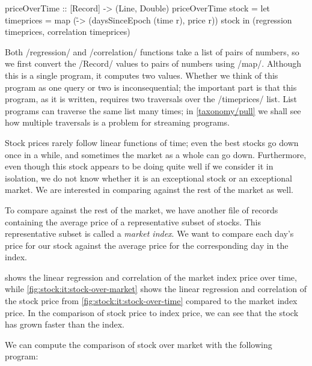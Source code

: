 \begin{haskell}
priceOverTime :: [Record] -> (Line, Double)
priceOverTime stock =
  let timeprices = map (\r -> (daysSinceEpoch (time r), price r)) stock
  in (regression timeprices, correlation timeprices)
\end{haskell}

Both \Hs/regression/ and \Hs/correlation/ functions take a list of pairs of numbers, so we first convert the \Hs/Record/ values to pairs of numbers using \Hs/map/.
Although this is a single program, it computes two values.
Whether we think of this program as one query or two is inconsequential; the important part is that this program, as it is written, requires two traversals over the \Hs/timeprices/ list.
List programs can traverse the same list many times; in \cref{taxonomy/pull} we shall see how multiple traversals is a problem for streaming programs.

Stock prices rarely follow linear functions of time; even the best stocks go down once in a while, and sometimes the market as a whole can go down.
Furthermore, even though this stock appears to be doing quite well if we consider it in isolation, we do not know whether it is an exceptional stock or an exceptional market.
We are interested in comparing against the rest of the market as well.

To compare against the rest of the market, we have another file of records containing the average price of a representative subset of stocks.
This representative subset is called a \emph{market index}.
We want to compare each day's price for our stock against the average price for the corresponding day in the index.



 shows the linear regression and correlation of the market index price over time, while \cref{fig:stock:it:stock-over-market} shows the linear regression and correlation of the stock price from \cref{fig:stock:it:stock-over-time} compared to the market index price.
In the comparison of stock price to index price, we can see that the stock has grown faster than the index.


We can compute the comparison of stock over market with the following program:
\newpage


